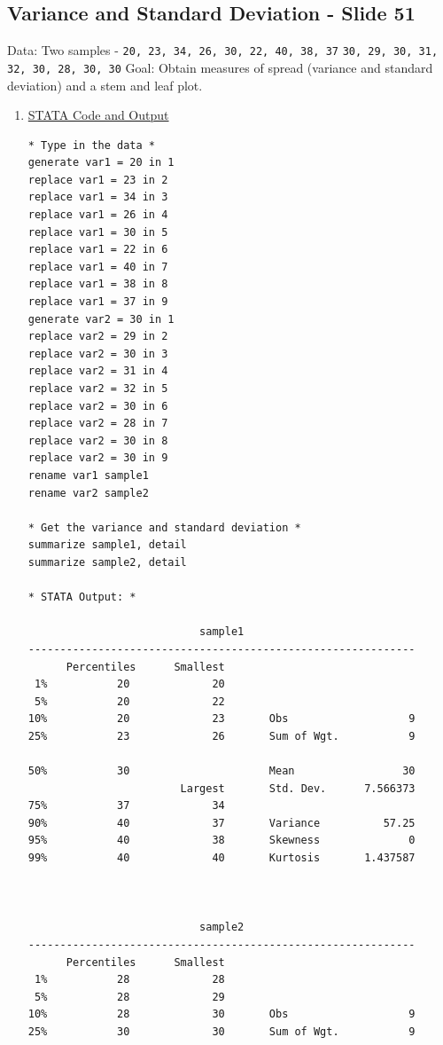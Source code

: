 \documentclass[11pt,letterpaper,fleqn]{report}
\begin{document}
\subsection{Variance and Standard Deviation - Slide 51}
Data: Two samples - 
\newline \texttt{20, 23, 34, 26, 30, 22, 40, 38, 37}
\newline \texttt{30, 29, 30, 31, 32, 30, 28, 30, 30}
\newline Goal: Obtain measures of spread (variance and standard deviation) and a stem and leaf plot.
\begin{enumerate}[]
\item \underline{STATA Code and Output}
{\scriptsize
\begin{verbatim}
* Type in the data *
generate var1 = 20 in 1
replace var1 = 23 in 2
replace var1 = 34 in 3
replace var1 = 26 in 4
replace var1 = 30 in 5
replace var1 = 22 in 6
replace var1 = 40 in 7
replace var1 = 38 in 8
replace var1 = 37 in 9
generate var2 = 30 in 1
replace var2 = 29 in 2
replace var2 = 30 in 3
replace var2 = 31 in 4
replace var2 = 32 in 5
replace var2 = 30 in 6
replace var2 = 28 in 7
replace var2 = 30 in 8
replace var2 = 30 in 9
rename var1 sample1
rename var2 sample2

* Get the variance and standard deviation *
summarize sample1, detail
summarize sample2, detail

* STATA Output: *

                           sample1
-------------------------------------------------------------
      Percentiles      Smallest
 1%           20             20
 5%           20             22
10%           20             23       Obs                   9
25%           23             26       Sum of Wgt.           9

50%           30                      Mean                 30
                        Largest       Std. Dev.      7.566373
75%           37             34
90%           40             37       Variance          57.25
95%           40             38       Skewness              0
99%           40             40       Kurtosis       1.437587



                           sample2
-------------------------------------------------------------
      Percentiles      Smallest
 1%           28             28
 5%           28             29
10%           28             30       Obs                   9
25%           30             30       Sum of Wgt.           9


\end{verbatim}}
\end{enumerate}
\end{document}
